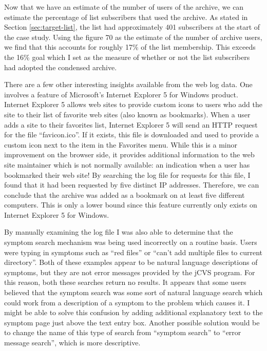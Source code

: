 Now that we have an estimate of the number of users of the archive, we can
estimate the percentage of list subscribers that used the archive. As stated in
Section \ref{sec:target-list}, the list had approximately 401 subscribers at
the start of the case study. Using the figure 70 as the estimate of the number
of archive users, we find that this accounts for roughly 17\% of the list
membership. This exceeds the 16\% goal which I set as the measure of whether or
not the list subscribers had adopted the condensed archive.

There are a few other interesting insights available from the web log data. One
involves a feature of Microsoft's Internet Explorer 5 for Windows product.
Internet Explorer 5 allows web sites to provide custom icons to users who add
the site to their list of favorite web sites (also known as bookmarks). When a
user adds a site to their favorites list, Internet Explorer 5 will send an HTTP
request for the file ``favicon.ico''. If it exists, this file is downloaded and
used to provide a custom icon next to the item in the Favorites menu. While
this is a minor improvement on the browser side, it provides additional
information to the web site maintainer which is not normally available: an
indication when a user has bookmarked their web site! By searching the log file
for requests for this file, I found that it had been requested by five distinct
IP addresses. Therefore, we can conclude that the archive was added as a
bookmark on at least five different computers. This is only a lower bound since
this feature currently only exists on Internet Explorer 5 for Windows.

By manually examining the log file I was also able to determine that the
symptom search mechanism was being used incorrectly on a routine basis. Users
were typing in symptoms such as ``red files'' or ``can't add multiple files to
current directory''. Both of these examples appear to be natural language
descriptions of symptoms, but they are not error messages provided by the jCVS
program. For this reason, both these searches return no results. It appears
that some users believed that the symptom search was some sort of natural
language search which could work from a description of a symptom to the problem
which causes it. I might be able to solve this confusion by adding additional
explanatory text to the symptom page just above the text entry box. Another
possible solution would be to change the name of this type of search from
``symptom search'' to ``error message search'', which is more descriptive.

